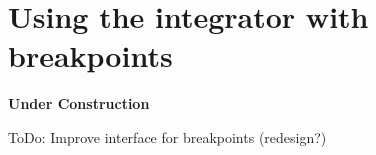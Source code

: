 \newpage
\section{Using the integrator with breakpoints}
\label{sec:app_integrator}

{\bf \large \hspace{4.5cm} Under Construction}

ToDo: Improve interface for breakpoints (redesign?)